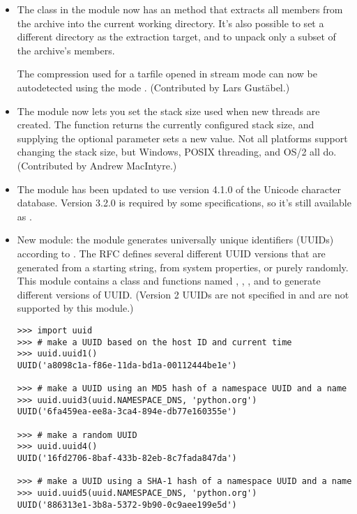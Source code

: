 \documentclass{howto}
\begin{document}
\begin{itemize}
\item The  class in the  module now has
an  method that extracts all members from the
archive into the current working directory.  It's also possible to set
a different directory as the extraction target, and to unpack only a
subset of the archive's members.

The compression used for a tarfile opened in stream mode can now be
autodetected using the mode .
(Contributed by Lars Gust\"abel.)

\item The  module now lets you set the stack size
used when new threads are created. The
 function returns the
currently configured stack size, and supplying the optional 
parameter sets a new value.  Not all platforms support changing the
stack size, but Windows, POSIX threading, and OS/2 all do.
(Contributed by Andrew MacIntyre.)

\item The  module has been updated to use version 4.1.0
of the Unicode character database.  Version 3.2.0 is required 
by some specifications, so it's still available as 
.

\item New module: the   module generates 
universally unique identifiers (UUIDs) according to .  The
RFC defines several different UUID versions that are generated from a
starting string, from system properties, or purely randomly.  This
module contains a  class and 
functions named ,
, ,  and 
 to generate different versions of UUID.  (Version 2 UUIDs 
are not specified in  and are not supported by this module.)

\begin{verbatim}
>>> import uuid
>>> # make a UUID based on the host ID and current time
>>> uuid.uuid1()
UUID('a8098c1a-f86e-11da-bd1a-00112444be1e')

>>> # make a UUID using an MD5 hash of a namespace UUID and a name
>>> uuid.uuid3(uuid.NAMESPACE_DNS, 'python.org')
UUID('6fa459ea-ee8a-3ca4-894e-db77e160355e')

>>> # make a random UUID
>>> uuid.uuid4()
UUID('16fd2706-8baf-433b-82eb-8c7fada847da')

>>> # make a UUID using a SHA-1 hash of a namespace UUID and a name
>>> uuid.uuid5(uuid.NAMESPACE_DNS, 'python.org')
UUID('886313e1-3b8a-5372-9b90-0c9aee199e5d')
\end{verbatim}


\end{itemize}
\end{document}
